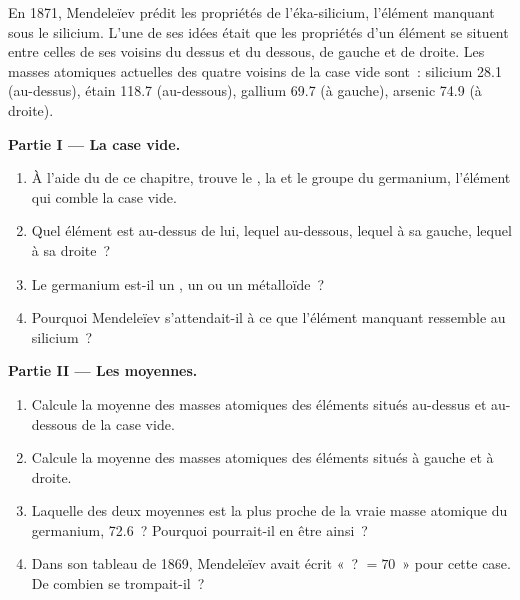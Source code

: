 \begin{problem}
\label{pb:g9:periodic-table-first-look:1}
En 1871, Mendeleïev prédit les propriétés de l'éka-silicium, l'élément
manquant sous le silicium. L'une de ses idées était que les propriétés
d'un élément se situent entre celles de ses voisins du dessus et du
dessous, de gauche et de droite. Les masses atomiques actuelles des
quatre voisins de la case vide sont~: silicium 28.1 (au-dessus), étain
118.7 (au-dessous), gallium 69.7 (à gauche), arsenic 74.9 (à droite).

\medskip
\noindent\textbf{Partie I --- La case vide.}
\begin{enumerate}
  \item À l'aide du  de ce chapitre, trouve le , la  et le groupe du germanium, l'élément qui
        comble la case vide.
  \item Quel élément est au-dessus de lui, lequel au-dessous, lequel à
        sa gauche, lequel à sa droite~?
  \item Le germanium est-il un , un  ou un métalloïde~?
  \item Pourquoi Mendeleïev s'attendait-il à ce que l'élément manquant
        ressemble au silicium~?
\end{enumerate}

\medskip
\noindent\textbf{Partie II --- Les moyennes.}
\begin{enumerate}[resume]
  \item Calcule la moyenne des masses atomiques des éléments situés
        au-dessus et au-dessous de la case vide.
  \item Calcule la moyenne des masses atomiques des éléments situés à
        gauche et à droite.
  \item Laquelle des deux moyennes est la plus proche de la vraie masse
        atomique du germanium, 72.6~? Pourquoi pourrait-il en être
        ainsi~?
  \item Dans son tableau de 1869, Mendeleïev avait écrit «~? $= 70$~»
        pour cette case. De combien se trompait-il~?
\end{enumerate}


\end{problem}
